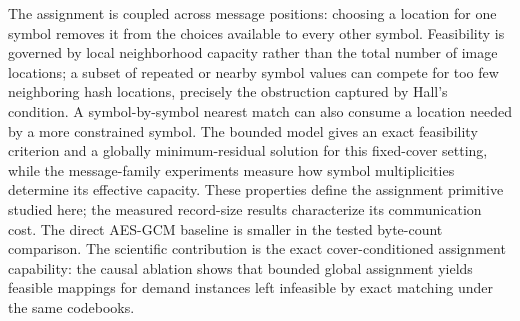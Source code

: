 \documentclass[preprint,12pt]{elsarticle}
\theoremstyle{plain}
\begin{document}
The assignment is coupled across message positions: choosing a location for one
symbol removes it from the choices available to every other symbol. Feasibility
is governed by local neighborhood capacity rather than the total number of
image locations; a subset of repeated or nearby symbol values can compete for
too few neighboring hash locations, precisely the obstruction captured by
Hall's condition. A
symbol-by-symbol nearest match can also consume a location needed by a more
constrained symbol. The bounded model gives an exact feasibility criterion and
a globally minimum-residual solution for this fixed-cover setting, while the
message-family experiments measure how symbol multiplicities determine its
effective capacity. These properties define the assignment primitive studied
here; the measured record-size results characterize its communication cost.
The direct AES-GCM baseline is smaller in the tested byte-count comparison.
The scientific contribution is the exact cover-conditioned assignment
capability: the causal ablation shows that bounded global assignment yields
feasible mappings for demand instances left infeasible by exact matching under
the same codebooks.
\end{document}
